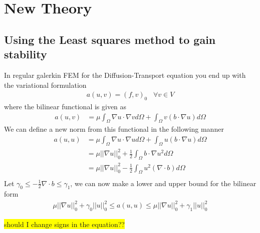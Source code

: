 
\chapter{New Theory} %

\label{chap:newTheory} %


\section{Using the Least squares method to gain stability}

In regular galerkin FEM for the Diffusion-Transport equation you end up with the variational formulation 
\begin{align}
	a(u,v) = (f,v)_0 \; \; \; \forall v \in V
	\label{eq:varFormDiffFEM}
\end{align}
where the bilinear functional is given as 
\begin{align}
	a(u,v) &= \mu\int_{\Omega}\nabla u \cdot \nabla v d\Omega 
	+ \int_{\Omega} v (b \cdot \nabla u) d \Omega
	\label{eq:bilinearFunctional}
\end{align}
We can define a new norm from this functional in the following manner
\begin{align}
	a(u,u) &= \mu\int_{\Omega}\nabla u \cdot \nabla u d\Omega 
	+ \int_{\Omega} u (b \cdot \nabla u) d \Omega\\
	       &= \mu||\nabla u||^2_0 
	+ \frac{1}{2}\int_{\Omega} b \cdot \nabla u^2 d \Omega \\
	       &= \mu||\nabla u||^2_0 
	- \frac{1}{2}\int_{\Omega} u^2  (\nabla \cdot b)  d \Omega \\
	\label{eq:bilinearFunctional}
\end{align}
Let $\gamma_0 \leq - \frac{1}{2}\nabla \cdot b \leq \gamma_1 $, we can now make a lower and upper bound for the bilinear form 
\begin{align}
	\mu||\nabla u||^2_0 + \gamma_0||u||^2_0 \leq a(u,u) \leq \mu||\nabla u||^2_0 + \gamma_1||u||^2_0
	\label{eq:bilinearOperatorBounds}
\end{align}

\colorbox{yellow}{should I change signs in the equation?? } 

